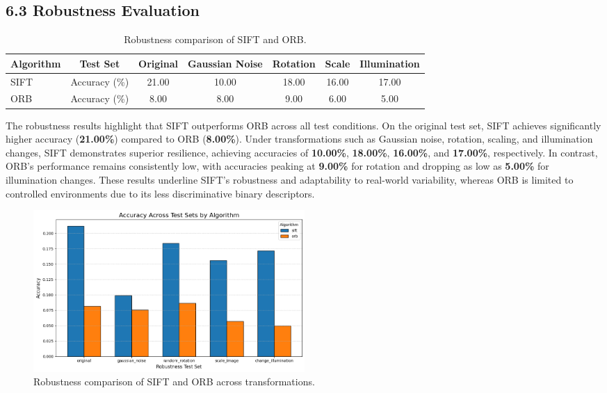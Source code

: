 \documentclass[12pt]{article}
\begin{document}
\subsection*{6.3 Robustness Evaluation}
\begin{table}[h!]
\centering
\begin{tabular}{@{}lcccccc@{}}
\toprule
\textbf{Algorithm} & \textbf{Test Set}         & \textbf{Original} & \textbf{Gaussian Noise} & \textbf{Rotation} & \textbf{Scale} & \textbf{Illumination} \\ \midrule
SIFT               & Accuracy (\%)            & 21.00             & 10.00                   & 18.00             & 16.00          & 17.00                 \\
ORB                & Accuracy (\%)            & 8.00              & 8.00                    & 9.00              & 6.00           & 5.00                  \\ \bottomrule
\end{tabular}
\caption{Robustness comparison of SIFT and ORB.}
\label{tab:robustness_comparison}
\end{table}

\textbf{} The robustness results highlight that SIFT outperforms ORB across all test conditions. On the original test set, SIFT achieves significantly higher accuracy (\textbf{21.00\%}) compared to ORB (\textbf{8.00\%}). Under transformations such as Gaussian noise, rotation, scaling, and illumination changes, SIFT demonstrates superior resilience, achieving accuracies of \textbf{10.00\%}, \textbf{18.00\%}, \textbf{16.00\%}, and \textbf{17.00\%}, respectively. In contrast, ORB's performance remains consistently low, with accuracies peaking at \textbf{9.00\%} for rotation and dropping as low as \textbf{5.00\%} for illumination changes. These results underline SIFT’s robustness and adaptability to real-world variability, whereas ORB is limited to controlled environments due to its less discriminative binary descriptors.


\begin{figure}[h!]
    \centering
    \includegraphics[width=0.5\textwidth]{figures/robust.png} %
    \caption{Robustness comparison of SIFT and ORB across transformations.}
    \label{fig:robustness_chart}
\end{figure}
\end{document}

